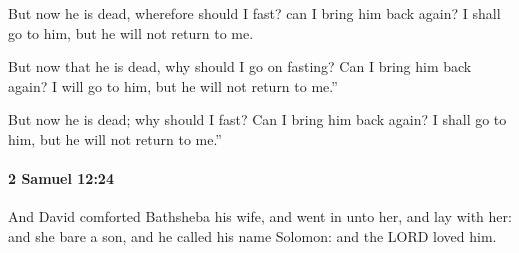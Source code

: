 			\begin{versebox}
					\item[BHS] 
					\item[ASV] But now he is dead, wherefore should I fast? can I bring him back again? I shall go to him, but he will not return to me.
					\item[NIV] But now that he is dead, why should I go on fasting? Can I bring him back again? I will go to him, but he will not return to me.”
					\item[NRSV] But now he is dead; why should I fast? Can I bring him back again? I shall go to him, but he will not return to me.”
			\end{versebox}

		\paragraph{2 Samuel 12:24} %
			\label{2SAMUEL-12-24}

			And David comforted Bathsheba his wife, and went in unto her, and lay with her: and she bare a son, and he called his name Solomon: and the LORD loved him.

